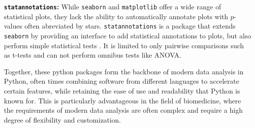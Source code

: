 \textbf{\texttt{statannotations}:} While \texttt{seaborn} and
\texttt{matplotlib} offer a wide range of statistical plots, they lack the
ability to automatically annotate plots with $p$-values often abreviated by
stars. \texttt{statannotations} is a package that extends \texttt{seaborn} by
providing an interface to add statistical annotations to plots, but also perform
simple statistical tests \cite{charlierTrevismdStatannotationsV02022}. It is
limited to only pairwise comparisons such as t-tests and can not perform omnibus
tests like ANOVA.


Together, these python packages form the backbone of modern data analysis in Python,
often times combining software from different languages to accelerate certain
features, while retaining the ease of use and readability that Python is known
for. This is particularly advantageous in the field of biomedicine, where the
requirements of modern data analysis are often complex and require a high degree
of flexibility and customization.
